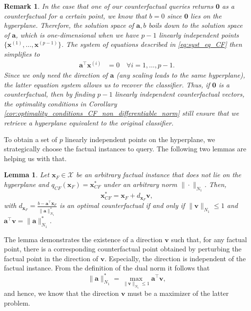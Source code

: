 \documentclass{article}
\newtheorem{lemma}[theorem]{Lemma}
\newtheorem{remark}[theorem]{Remark}
\begin{document}
\begin{remark}
In the case that one of our counterfactual queries returns $\bm{0}$ as a counterfactual for a certain point, we know that $b=0$ since $\bm{0}$ lies on the hyperplane. Therefore, the solution space of $\bm{a},b$ boils down to the solution space of $\bm{a}$, which is one-dimensional when we have $p-1$ linearly independent points $\{\bm{x}^{(1)},\ldots, \bm{x}^{(p-1)}\}$. The system of equations described in \eqref{eq:syst_eq_CF} then simplifies to
\begin{align*}%
\bm{a}^\top \bm{x}^{(i)} & = 0 \quad \forall i=1,\ldots, p-1.
\end{align*}
Since we only need the direction of $\bm{a}$ (any scaling leads to the same hyperplane), the latter equation system allows us to recover the classifier. Thus, if $\bm{0}$ is a counterfactual, then by finding $p-1$ linearly independent counterfactual vectors, the optimality conditions in Corollary \ref{cor:optimality_conditions_CF_non_differentiable_norm} still ensure that we retrieve a hyperplane equivalent to the original classifier.
\end{remark}

To obtain a set of $p$ linearly independent points on the hyperplane, we strategically choose the factual instances to query. The following two lemmas are helping us with that.

\begin{lemma}\label{lem:CF_direction}
Let $\bm{x}_F\in \mathcal X$ be an arbitrary factual instance that does not lie on the hyperplane and $q_{CF}(\bm{x}_F) = \bm{x}_{CF}^*$ under an arbitrary norm $ \| \cdot \|_{N_1}$. Then,
\begin{equation}\label{eq:CF_direction}
        \bm{x}_{CF}^*=\bm{x}_F+d_{\bm{x}_F}\bm{v},
    \end{equation}
with $d_{\bm{x}_F}=\frac{b-\bm{a}^{\top}\bm{x}_F}{\|\bm{a}\|_{N_1}^*}$ is an optimal counterfactual if and only if $\|\bm{v}\|_{N_1}\leq 1$ and $\bm{a}^{\top}\bm{v}=\|\bm{a}\|_{N_1}^*$.
\end{lemma}

The lemma demonstrates the existence of a direction $\bm{v}$ such that, for any factual point, there is a corresponding counterfactual point obtained by perturbing the factual point in the direction of $\bm{v}$. Especially, the direction is independent of the factual instance. From the definition of the dual norm it follows that
\begin{equation}\label{eq:max_dir}
    \|\bm{a}\|_{N_1}^* = \max_{\| \bm{v}\|_{N_1} \le 1} \bm{a}^\top \bm{v},
\end{equation}
and hence, we know that the direction $\bm{v}$ must be a maximizer of the latter problem. 
\end{document}
